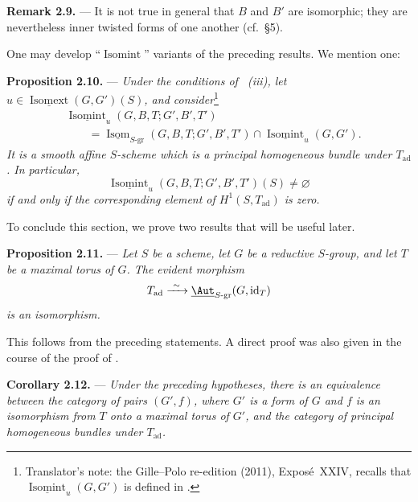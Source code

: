 
\medskip\noindent\textbf{Remark 2.9.} ---
It is not true in general that \(B\) and \(B'\) are isomorphic;
they are nevertheless inner twisted forms of one another
(cf.\ \S5).

One may develop ``\(\operatorname{Isomint}\)'' variants
of the preceding results. We mention one:

\medskip\noindent\textbf{Proposition 2.10.} ---
{\itshape Under the conditions of ~\textup{(iii)}, let
\(u\in\underline{\operatorname{Isomext}}(G,G')(S)\), and consider}\footnote{Translator's note: the Gille--Polo re-edition (2011), Exposé~XXIV,
recalls that \(\underline{\operatorname{Isomint}}_u(G,G')\) is defined in
.}
\[
\begin{aligned}
  &\underline{\operatorname{Isomint}}_u
     (G,B,T;G',B',T')\\
  &\qquad =
  \underline{\operatorname{Isom}}_{S\text{-}\mathrm{gr}}
     (G,B,T;G',B',T')
  \cap
  \underline{\operatorname{Isomint}}_u(G,G').
\end{aligned}
\]
{\itshape It is a smooth affine \(S\)-scheme which is a principal
homogeneous bundle under \(T_{\mathrm{ad}}\). In particular,}
\[
  \underline{\operatorname{Isomint}}_u
    (G,B,T;G',B',T')(S)\ne\varnothing
\]
{\itshape if and only if the corresponding element of
\(H^1(S,T_{\mathrm{ad}})\) is zero.}

To conclude this section, we prove two results that will be useful
later.

\medskip\noindent\textbf{Proposition 2.11.} ---
{\itshape Let \(S\) be a scheme, let \(G\) be a reductive \(S\)-group,
and let \(T\) be a maximal torus of \(G\). The evident morphism}
\[
  T_{\mathrm{ad}}
  \xrightarrow{\ \sim\ }
  \underline{\Aut}_{S\text{-}\mathrm{gr}}(G,\operatorname{id}_T)
\]
{\itshape is an isomorphism.}

This follows from the preceding statements. A direct proof was also
given in the course of the proof of .

\medskip\noindent\textbf{Corollary 2.12.} ---
{\itshape Under the preceding hypotheses, there is an equivalence
between the category of pairs \((G',f)\), where \(G'\) is a form of
\(G\) and \(f\) is an isomorphism from \(T\) onto a maximal torus of
\(G'\), and the category of principal homogeneous bundles under
\(T_{\mathrm{ad}}\).}

